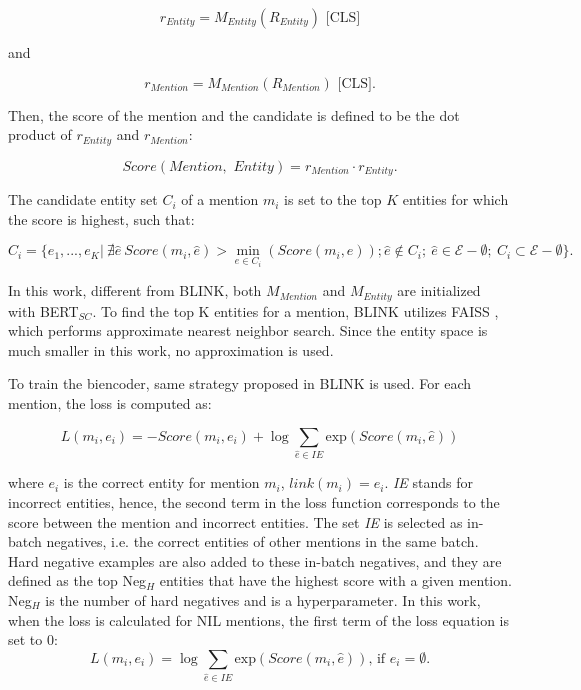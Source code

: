 \documentclass{report}
\theoremstyle{definition}
\theoremstyle{remark}
\begin{document}
\begin{equation}
    r_{Entity} = M_{Entity}(R_{Entity}) \text{ [CLS]}
\end{equation}

and 

\begin{equation}
    r_{Mention} = M_{Mention}(R_{Mention})\text{ [CLS].}
\end{equation}

\noindent Then, the score of the mention and the candidate is defined to be the dot product of $r_{Entity}$ and $r_{Mention}$:

\begin{equation}
    Score(\textit{Mention},\textit{ Entity}) = r_{Mention} \cdot r_{Entity}.
\end{equation}

The candidate entity set $C_i$ of a mention $m_i$ is set to the top $K$ entities for which the score is highest, such that:

\begin{equation}
    C_i = \{e_1,...,e_K | \ \nexists\hat{e} \ Score(m_i,\hat{e}) > \min_{e\in C_i}(Score(m_i, e )); \hat{e} \notin C_i; \ \hat{e} \in \mathcal{E}-\emptyset; \ C_i \subset \mathcal{E}-\emptyset  \}.
\end{equation}

In this work, different from BLINK, both $M_{Mention}$ and $M_{Entity}$ are initialized with BERT$_{SC}$. To find the top K entities for a mention, BLINK utilizes FAISS \cite{faiss}, which performs approximate nearest neighbor search. Since the entity space is much smaller in this work, no approximation is used. 

To train the biencoder, same strategy proposed in BLINK is used. For each mention, the loss is computed as:

\begin{equation}
    L(m_i,e_i) = -Score(m_i,e_i) + \log \sum_{\hat{e} \in IE} \text{exp}( Score(m_i,\hat{e}))
\end{equation}

\noindent where $e_i$ is the correct entity for mention $m_i$, $link(m_i)=e_i$. \textit{IE} stands for incorrect entities, hence, the second term in the loss function corresponds to the score between the mention and incorrect entities. The set \textit{IE} is selected as in-batch negatives, i.e. the correct entities of other mentions in the same batch. Hard negative examples are also added to these in-batch negatives, and they are defined as the top Neg$_H$ entities that have the highest score with a given mention. Neg$_H$ is the number of hard negatives and is a hyperparameter. In this work, when the loss is calculated for NIL mentions, the first term of the loss equation is set to 0:
\begin{equation}
    L(m_i,e_i) = \log \sum_{\hat{e} \in IE} \text{exp}( Score(m_i,\hat{e})) \text{, if } e_i = \emptyset.
\end{equation}
\end{document}
